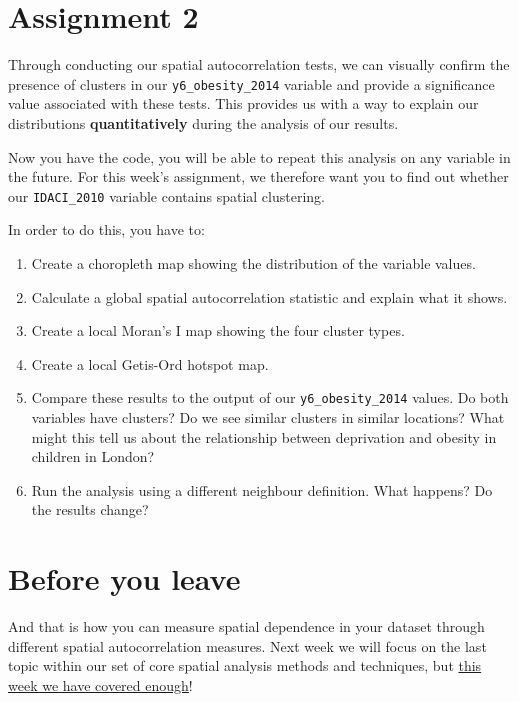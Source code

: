 \documentclass[
]{book}
\providecommand{\tightlist}{%
  \setlength{\itemsep}{0pt}\setlength{\parskip}{0pt}}
\begin{document}
\hypertarget{assignment-2-w07}{%
\section{Assignment 2}\label{assignment-2-w07}}

Through conducting our spatial autocorrelation tests, we can visually confirm the presence of clusters in our \texttt{y6\_obesity\_2014} variable and provide a significance value associated with these tests. This provides us with a way to explain our distributions \textbf{quantitatively} during the analysis of our results.

Now you have the code, you will be able to repeat this analysis on any variable in the future. For this week's assignment, we therefore want you to find out whether our \texttt{IDACI\_2010} variable contains spatial clustering.

In order to do this, you have to:

\begin{enumerate}
\def\labelenumi{\arabic{enumi}.}
\tightlist
\item
  Create a choropleth map showing the distribution of the variable values.
\item
  Calculate a global spatial autocorrelation statistic and explain what it shows.
\item
  Create a local Moran's I map showing the four cluster types.
\item
  Create a local Getis-Ord hotspot map.
\item
  Compare these results to the output of our \texttt{y6\_obesity\_2014} values. Do both variables have clusters? Do we see similar clusters in similar locations? What might this tell us about the relationship between deprivation and obesity in children in London?
\item
  Run the analysis using a different neighbour definition. What happens? Do the results change?
\end{enumerate}

\hypertarget{byl-w07}{%
\section{Before you leave}\label{byl-w07}}

And that is how you can measure spatial dependence in your dataset through different spatial autocorrelation measures. Next week we will focus on the last topic within our set of core spatial analysis methods and techniques, but \href{https://www.youtube.com/watch?v=fCZVL_8D048}{this week we have covered enough}!
\end{document}
